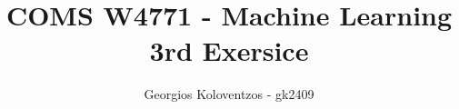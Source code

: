 \documentclass[letterpaper,single,9pt]{article}
\begin{document}
\title{COMS W4771 - Machine Learning 3rd Exersice}

  \author{ {\rm Georgios Koloventzos - gk2409} \\ }

\maketitle


%

%
\end{document}
